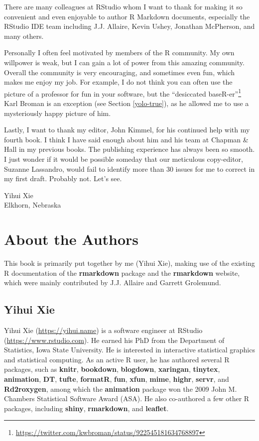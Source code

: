 \documentclass[
  11pt,
]{krantz}
\renewcommand{\href}[2]{#2\footnote{\url{#1}}}
\theoremstyle{definition}
\theoremstyle{definition}
\theoremstyle{definition}
\theoremstyle{definition}
\theoremstyle{remark}
\begin{document}
There are many colleagues at RStudio whom I want to thank for making it so convenient and even enjoyable to author R Markdown documents, especially the RStudio IDE team including J.J. Allaire, Kevin Ushey, Jonathan McPherson, and many others.

Personally I often feel motivated by members of the R community. My own willpower is weak, but I can gain a lot of power from this amazing community. Overall the community is very encouraging, and sometimes even fun, which makes me enjoy my job. For example, I do not think you can often use the picture of a professor for fun in your software, but the \href{https://twitter.com/kwbroman/status/922545181634768897}{``desiccated baseR-er''} Karl Broman is an exception (see Section \ref{yolo-true}), as he allowed me to use a mysteriously happy picture of him.

Lastly, I want to thank my editor, John Kimmel, for his continued help with my fourth book. I think I have said enough about him and his team at Chapman \& Hall in my previous books. The publishing experience has always been so smooth. I just wonder if it would be possible someday that our meticulous copy-editor, Suzanne Lassandro, would fail to identify more than 30 issues for me to correct in my first draft. Probably not. Let's see.

\begin{flushright}
Yihui Xie\\
Elkhorn, Nebraska \end{flushright}

\hypertarget{author}{%
\chapter*{About the Authors}\label{author}}


This book is primarily put together by me (Yihui Xie), making use of the existing R documentation of the \textbf{rmarkdown} package and the \textbf{rmarkdown} website, which were mainly contributed by J.J. Allaire and Garrett Grolemund.

\hypertarget{yihui-xie}{%
\section*{Yihui Xie}\label{yihui-xie}}


Yihui Xie (\url{https://yihui.name}) is a software engineer at RStudio (\url{https://www.rstudio.com}). He earned his PhD from the Department of Statistics, Iowa State University. He is interested in interactive statistical graphics and statistical computing. As an active R user, he has authored several R packages, such as \textbf{knitr}, \textbf{bookdown}, \textbf{blogdown}, \textbf{xaringan}, \textbf{tinytex}, \textbf{animation}, \textbf{DT}, \textbf{tufte}, \textbf{formatR}, \textbf{fun}, \textbf{xfun}, \textbf{mime}, \textbf{highr}, \textbf{servr}, and \textbf{Rd2roxygen}, among which the \textbf{animation} package won the 2009 John M. Chambers Statistical Software Award (ASA). He also co-authored a few other R packages, including \textbf{shiny}, \textbf{rmarkdown}, and \textbf{leaflet}.
\end{document}
